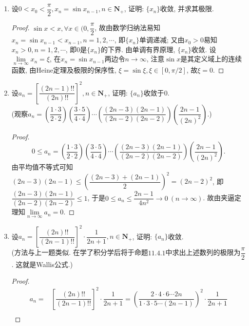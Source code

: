 \documentclass[a4paper,11pt,twoside]{ctexbook}
\begin{document}
\begin{enumerate}
\begin{proof}
\begin{equation*}
\begin{split}
				      =                & \dfrac{1-2^{k(1-p)}}{1-2^{1-p}}\leqslant \dfrac{1}{1-2^{1-p}}
			      \end{split}
		      \end{equation*}
		      这表明$\{S_n\}$有界, 又显然$\{S_n\}$单调递增, 故由单调有界原理知$\{S_n\}$收敛.\qedhere
	      \end{proof}
	\item 设$0<x_0<\dfrac{\pi}{2}, x_n=\sin{x_{n-1}}, n\in\mathbf{N}_{+}$, 证明: $\{x_n\}$收敛, 并求其极限.
	      \begin{proof}
		      $\sin{x}<x, \forall x\in(0,\dfrac{\pi}{2}$, 故由数学归纳法易知$x_n=\sin{x_{n-1}}<x_{n-1}, n=1, 2,\cdots$, 即$\{x_n\}$单调递减; 又由$x_0>0$易知$x_n>0, n=1,2,\cdots$, 即$0$是$\{x_n\}$的下界. 由单调有界原理, $\{x_n\}$收敛. 设$\lim\limits_{n\to\infty} x_n=\xi$, 在$x_n=\sin{x_{n-1}}$两边令$n\to\infty$, 注意$\sin{x}$是其定义域上的连续函数, 由Heine定理及极限的保序性, $\xi=\sin{\xi}, \xi\in[0,\pi/2]$, 故$\xi=0$.\qedhere
	      \end{proof}
	\item 设$a_n=\left[\dfrac{(2n-1)!!}{(2n)!!}\right]^2, n\in\mathbf{N}_{+}$, 证明: $\{a_n\}$收敛于$0$.\\
	      (观察$a_n=\left(\dfrac{1\cdot3}{2\cdot2}\right)\left(\dfrac{3\cdot5}{4\cdot4}\right)\cdots\left(\dfrac{(2n-3)(2n-1)}{(2n-2)(2n-2)}\right)\left(\dfrac{2n-1}{(2n)^2}\right)$.)
	      \begin{proof}
		      \[
			      0\leqslant a_n=\left(\dfrac{1\cdot3}{2\cdot2}\right)\left(\dfrac{3\cdot5}{4\cdot4}\right)\cdots\left(\dfrac{(2n-3)(2n-1)}{(2n-2)(2n-2)}\right)\left(\dfrac{2n-1}{(2n)^2}\right).
		      \]
		      由平均值不等式可知$(2n-3)(2n-1)\leqslant\left(\dfrac{(2n-3)+(2n-1)}{2}\right)^2=(2n-2)^2$, 即$\dfrac{(2n-3)(2n-1)}{(2n-2)(2n-2)}\leqslant 1$, 于是$0\leqslant a_n\leqslant\dfrac{2n-1}{4n^2}\to 0\ (n\to\infty)$. 故由夹逼定理知$\lim\limits_{n\to\infty} a_n=0$.\qedhere
	      \end{proof}
	\item 设$a_n=\left[\dfrac{(2n)!!}{(2n-1)!!}\right]^2\cdot\dfrac{1}{2n+1}, n\in\mathbf{N}_{+}$, 证明: $\{a_n\}$收敛.\\
	      (方法与上一题类似. 在学了积分学后将于命题$11.4.1$中求出上述数列的极限为$\dfrac{\pi}{2}$. 这就是Wallis公式.)
	      \begin{proof}
		      \begin{equation*}
			      \begin{split}
				      a_n=&\left[\dfrac{(2n)!!}{(2n-1)!!}\right]^2\cdot\dfrac{1}{2n+1}=\left(\dfrac{2\cdot4\cdot6\cdots2n}{1\cdot3\cdot5\cdots(2n-1)}\right)^2\cdot\dfrac{1}{2n+1}\\

\end{split}
\end{equation*}
\end{proof}
\end{enumerate}
\end{document}
